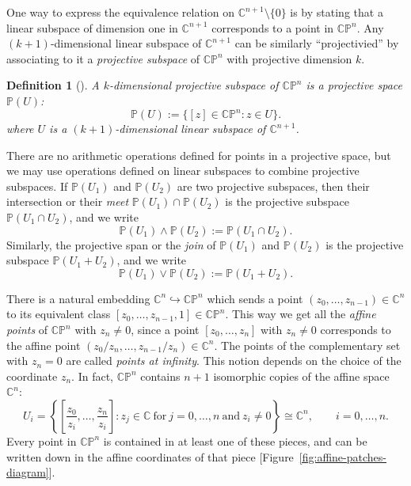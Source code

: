 \documentclass[10pt, a4paper]{article}
\theoremstyle{BoldTopSpacing}
\theoremstyle{BoldTopSpacing}
\theoremstyle{BoldTopSpacing}
\theoremstyle{BoldTopBottomSpacing}
\newtheorem{definition}{Definition}[section]
\theoremstyle{BoldTopSpacing}
\theoremstyle{BoldTopBottomSpacing}
\theoremstyle{remark}
\begin{document}
One way to express the equivalence relation on $\mathbb{C}^{n+1} \setminus \{ 0 \}$ is by stating that a linear subspace of dimension one in $\mathbb{C}^{n + 1}$ corresponds to a point in $\mathbb{C}\mathbb{P}^n$. Any $(k+1)$-dimensional linear subspace of $\mathbb{C}^{n + 1}$ can be similarly \enquote{projectivied} by associating to it a \textit{projective subspace} of $\mathbb{C}\mathbb{P}^n$ with projective dimension $k$.

\begin{definition}[]
\label{def:projective-subspace}
A $k$-dimensional projective subspace of $\mathbb{C}\mathbb{P}^n$ is a projective space $\mathbb{P}(U)$:
   \[
       \mathbb{P}(U) := \{ [z] \in \mathbb{C}\mathbb{P}^n : z \in U \}.
   \]
where $U$ is a $(k+1)$-dimensional linear subspace of $\mathbb{C}^{n+1}$.
\end{definition}

There are no arithmetic operations defined for points in a projective space, but we may use operations defined on linear subspaces to combine projective subspaces. \newline
If $\mathbb{P}(U_{1})$ and $\mathbb{P}(U_{2})$ are two projective subspaces, then their intersection or their \textit{meet }$ \mathbb{P}(U_{1}) \cap \mathbb{P}(U_{2})$ is the projective subspace $\mathbb{P}(U_{1} \cap U_{2})$, and we write
\[
\mathbb{P}(U_{1}) \wedge \mathbb{P}(U_{2}) := \mathbb{P}(U_{1} \cap U_{2}).
\]
Similarly, the projective span or the \textit{join} of $\mathbb{P}(U_{1})$ and $\mathbb{P}(U_{2})$ is the projective subspace $\mathbb{P}(U_{1} + U_{2})$, and we write
\[
\mathbb{P}(U_{1}) \vee \mathbb{P}(U_{2}) := \mathbb{P}(U_{1} + U_{2}).
\]

There is a natural embedding $\mathbb{C}^n \hookrightarrow \mathbb{C}\mathbb{P}^n$ which sends a point $(z_{0}, \dots, z_{n-1}) \in \mathbb{C}^n$ to its equivalent class $[z_{0},\dots, z_{n-1}, 1] \in \mathbb{C}\mathbb{P}^n$. This way we get all the \textit{affine points} of $\mathbb{C}\mathbb{P}^n$ with $z_{n} \neq 0$, since a point $[z_{0}, \dots, z_{n}]$ with $z_{n} \neq 0$ corresponds to the affine point $(z_{0}/z_{n}, \dots, z_{n-1}/z_{n}) \in \mathbb{C}^{n}$. The points of the complementary set with $z_{n} = 0$ are called \textit{points at infinity}. This notion depends on the choice of the coordinate $z_{n}$. In fact, $\mathbb{C}\mathbb{P}^n$ contains $n + 1$ isomorphic copies of the affine space $\mathbb{C}^n$:
\[
    U_{i} = \left\{ \left[ \frac{z_{0}}{z_{i}}, \dots, \frac{z_{n}}{z_{i}} \right] : z_{j} \in \mathbb{C} \ \text{for} \ j=0, \dots, n \ \text{and} \ z_{i} \neq 0 \right\} \cong \mathbb{C}^n, \quad \quad i=0, \dots, n.
\]
Every point in $\mathbb{C}\mathbb{P}^n$ is contained in at least one of these pieces, and can be written down in the affine coordinates of that piece [Figure~\ref{fig:affine-patches-diagram}].\par
\end{document}
